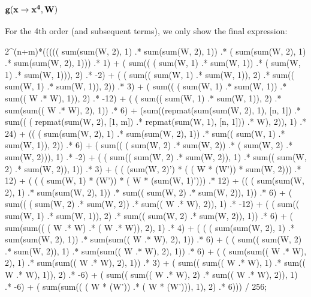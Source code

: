 \documentclass[]{article}
\begin{document}




\subsection{{$\bf g(x \rightarrow x^4, W)$}}

For the 4th order (and subsequent terms), we only show the final expression:


             2\^{}(n+m)*((((( sum(sum(W, 2), 1) .* sum(sum(W, 2), 1))  .* ( sum(sum(W, 2), 1) .* sum(sum(W, 2), 1)))  .* 1)  
              + ( sum(( ( sum(W, 1) .* sum(W, 1)) .* ( sum(W, 1) .* sum(W, 1))), 2) .* -2)  
              + ( ( sum(( sum(W, 1) .* sum(W, 1)), 2) .* sum(( sum(W, 1) .* sum(W, 1)), 2)) .* 3)  
              + ( sum(( ( sum(W, 1) .* sum(W, 1)) .* sum(( W .* W), 1)), 2) .* -12)  
              + ( ( sum(( sum(W, 1) .* sum(W, 1)), 2) .* sum(sum(( W .* W), 2), 1)) .* 6)  
              + (sum((repmat(sum(sum(W, 2), 1), [n, 1])  .* sum(( ( repmat(sum(W, 2), [1, m]) .* repmat(sum(W, 1), [n, 1])) .* W), 2)), 1)  .* 24)  
              + (( ( sum(sum(W, 2), 1) .* sum(sum(W, 2), 1)) .* sum(( sum(W, 1) .* sum(W, 1)), 2))  .* 6)  
              + ( sum(( ( sum(W, 2) .* sum(W, 2)) .* ( sum(W, 2) .* sum(W, 2))), 1) .* -2)  
              + ( ( sum(( sum(W, 2) .* sum(W, 2)), 1) .* sum(( sum(W, 2) .* sum(W, 2)), 1)) .* 3)  
              + ( ( (sum(W, 2)') * ( ( W * (W')) * sum(W, 2))) .* 12)  
              + ( ( ( sum(W, 1) * (W')) * ( W * (sum(W, 1)'))) .* 12)  
              + (( ( sum(sum(W, 2), 1) .* sum(sum(W, 2), 1)) .* sum(( sum(W, 2) .* sum(W, 2)), 1))  .* 6)  
              + ( sum(( ( sum(W, 2) .* sum(W, 2)) .* sum(( W .* W), 2)), 1) .* -12)  
              + ( ( sum(( sum(W, 1) .* sum(W, 1)), 2) .* sum(( sum(W, 2) .* sum(W, 2)), 1)) .* 6)  
              + ( sum(sum(( ( W .* W) .* ( W .* W)), 2), 1) .* 4)  
              + ( ( ( sum(sum(W, 2), 1) .* sum(sum(W, 2), 1)) .* sum(sum(( W .* W), 2), 1)) .* 6)  
              + ( ( sum(( sum(W, 2) .* sum(W, 2)), 1) .* sum(sum(( W .* W), 2), 1)) .* 6)  
              + ( ( sum(sum(( W .* W), 2), 1) .* sum(sum(( W .* W), 2), 1)) .* 3)  
              + ( sum(( sum(( W .* W), 1) .* sum(( W .* W), 1)), 2) .* -6)  
              + ( sum(( sum(( W .* W), 2) .* sum(( W .* W), 2)), 1) .* -6)   
              + ( sum(sum(( ( W * (W')) .* ( W * (W'))), 1), 2) .* 6))) / 256;
\end{document}
